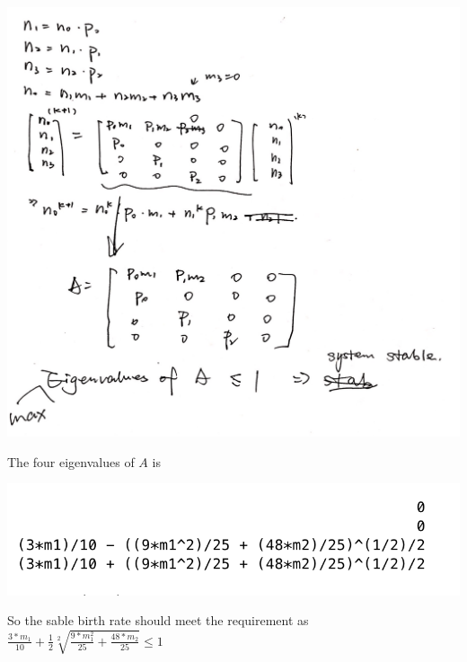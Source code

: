 \documentclass{article}
\begin{document}
\begin{enumerate}
\begin{center}
\includegraphics[scale=0.2]{hw1_pic.png}
\end{center}
The four eigenvalues of $A$ is 
\begin{center}
\includegraphics[scale=0.65]{eig.png}
\end{center}

So the sable birth rate should meet the requirement as $\frac{3*m_1}{10} + \frac{1}{2}\sqrt[2]{\frac{9*m_1^2}{25} + \frac{48*m_2}{25}}\le 1$
\end{enumerate}
\end{document}
